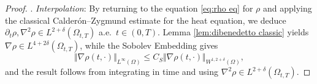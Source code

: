 \documentclass[11pt,a4paper,reqno]{amsart}
\theoremstyle{remark}
\theoremstyle{definition}
\numberwithin{equation}{section}
\begin{document}
\begin{proof}
   

    \smallskip 

    . \textit{Interpolation}: By returning to the equation \eqref{eq:rho eq} for $\rho$ and applying the classical Calder\'on--Zygmund estimate for the heat equation, we deduce $\partial_t \rho, \nabla^2 \rho \in L^{2+\delta}(\Omega_{t,T})$ a.e.~$t\in(0,T)$. Lemma \ref{lem:dibenedetto classic} yields $\nabla \rho \in L^{4+2\delta}(\Omega_{t,T})$, while the Sobolev Embedding gives 
    \begin{equation*}
        \Vert \nabla \rho(t,\cdot) \Vert_{L^\infty(\Omega)} \leq C_S \Vert \nabla \rho(t,\cdot) \Vert_{W^{1,2+\delta}(\Omega)}, 
    \end{equation*}
    and the result follows from integrating in time and using $\nabla^2 \rho \in L^{2+\delta}(\Omega_{t,T})$. 
\end{proof}
\end{document}
